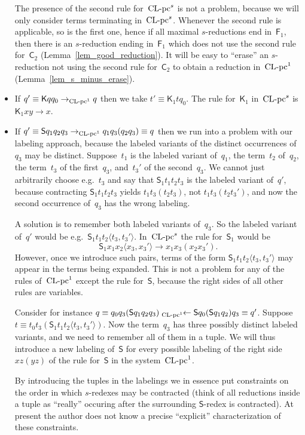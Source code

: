 \documentclass[a4paper,UKenglish]{lipics-v2016}
\newcommand{\Cs}{\mathsf{C}}
\newcommand{\Fs}{\mathsf{F}}
\newcommand{\Ss}{\mathsf{S}}
\newcommand{\Ks}{\mathsf{K}}
\newcommand{\from}{\ensuremath{\leftarrow}}
\newcommand{\la}{\ensuremath{\langle}}
\newcommand{\ra}{\ensuremath{\rangle}}
\newcommand{\leftidx}[3]{{\;\vphantom{#2}}#1\!\!#2#3}
\newcommand{\CLC}{{\mbox{${\text{\rm CL-pc}^1}$}}}
\newcommand{\sCLC}{{\ensuremath{\text{\rm CL-pc}^1}}}
\newcommand{\CLCs}{{\mbox{${\text{\rm CL-pc}^s}$}}}
\begin{document}
\begin{itemize}
  The presence of the second rule for~$\CLCs$ is not a problem,
  because we will only consider terms terminating in~$\CLCs$. Whenever
  the second rule is applicable, so is the first one, hence if all
  maximal $s$-reductions end in~$\Fs_1$, then there is an
  $s$-reduction ending in~$\Fs_1$ which does not use the second rule
  for~$\Cs_2$ (Lemma~\ref{lem_good_reduction}). It will be easy to
  ``erase'' an $s$-reduction not using the second rule for~$\Cs_2$ to
  obtain a reduction in~$\CLC$ (Lemma~\ref{lem_s_minus_erase}).
\item If $q' \equiv \Ks q q_0 \to_\sCLC q$ then we take
  $t' \equiv \Ks_1 t q_0$. The rule for~$\Ks_1$ in~$\CLCs$ is
  $\Ks_1 x y \to x$.
\item If
  $q' \equiv \Ss q_1 q_2 q_3 \to_\sCLC q_1 q_3 (q_2 q_3) \equiv q$
  then we run into a problem with our labeling approach, because the
  labeled variants of the distinct occurrences of~$q_3$ may be
  distinct. Suppose~$t_1$ is the labeled variant of~$q_1$, the
  term~$t_2$ of~$q_2$, the term~$t_3$ of the first~$q_3$, and~$t_3'$
  of the second~$q_3$. We cannot just arbitrarily choose e.g.~$t_3$
  and say that $\Ss_1 t_1 t_2 t_3$ is the labeled variant of~$q'$,
  because contracting $\Ss_1 t_1 t_2 t_3$ yields $t_1 t_3 (t_2 t_3)$,
  not $t_1 t_3 (t_2 t_3')$, and now the second occurrence of~$q_3$ has
  the wrong labeling.

  A solution is to remember both labeled variants of~$q_3$. So the
  labeled variant of~$q'$ would be
  e.g.~$\Ss_1 t_1 t_2 \la t_3, t_3' \ra$. In~$\CLCs$ the rule
  for~$\Ss_1$ would be
  \[
    \Ss_1 x_1 x_2 \la x_3, x_3' \ra \to x_1 x_3 (x_2 x_3').
  \]
  However, once we introduce such pairs, terms of the form
  $\Ss_1 t_1 t_2 \la t_3, t_3' \ra$ may appear in the terms being
  expanded. This is not a problem for any of the rules of~$\CLC$
  except the rule for~$\Ss$, because the right sides of all other
  rules are variables.

  Consider for instance
  $q \equiv q_0 q_3 (\Ss q_1 q_2 q_3) \leftidx{{}_\sCLC}{\from} \Ss
  q_0 (\Ss q_1 q_2) q_3 \equiv q'$. Suppose
  $t \equiv t_0 t_3 (\Ss_1 t_1 t_2 \la t_3, t_3' \ra)$. Now the
  term~$q_3$ has three possibly distinct labeled variants, and we need
  to remember all of them in a tuple. We will thus introduce a new
  labeling of~$\Ss$ for every possible labeling of the right
  side~$x z (y z)$ of the rule for~$\Ss$ in the system~$\CLC$.

  By introducing the tuples in the labelings we in essence put
  constraints on the order in which $s$-redexes may be contracted
  (think of all reductions inside a tuple as ``really'' occuring after
  the surrounding $\Ss$-redex is contracted). At present the author
  does not know a precise ``explicit'' characterization of these
  constraints.
\end{itemize}
\end{document}

